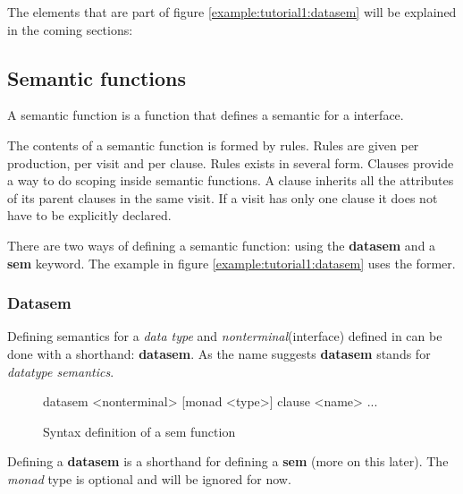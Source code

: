 The elements that are part of figure \ref{example:tutorial1:datasem} will be explained in the coming sections:

\subsection{Semantic functions}
\label{semantics}
A semantic function is a function that defines a semantic for a interface. %

The contents of a semantic function is formed by rules. Rules are given per production, per visit and per clause. Rules exists in several form. Clauses provide a way to do scoping inside semantic functions. A clause inherits all the attributes of its parent clauses in the same visit. If a visit has only one clause it does not have to be explicitly declared. 

There are two ways of defining a semantic function: using the \textbf{datasem} and a \textbf{sem} keyword. The example in figure \ref{example:tutorial1:datasem} uses the former.

\subsubsection{Datasem}
Defining semantics for a \emph{data type} and \emph{nonterminal}(interface) defined in \rcore can be done with a shorthand: \textbf{datasem}. As the name suggests \textbf{datasem} stands for \emph{datatype semantics}. %

\begin{figure}[!h]
\begin{code}
datasem <nonterminal> [monad <type>]
    {clause <name>
        ...
    }
\end{code}
\caption{Syntax definition of a sem function}
\label{datasem:syntax}
\end{figure}

Defining a \textbf{datasem} is a shorthand for defining a \textbf{sem} (more on this later). The \emph{monad} type is optional and will be ignored for now. %

